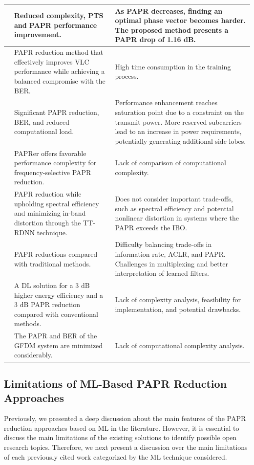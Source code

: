 \documentclass[conference]{IEEEtran}
\begin{document}
\begin{table}[t]
\begin{center}
\begin{tabular}{|c|p{6cm}|p{8cm}|}
\hline
\cite{b155} & Reduced complexity, PTS and PAPR performance improvement. & As PAPR decreases, finding an optimal phase vector becomes harder. The proposed method presents a PAPR drop of 1.16 dB. \\
\hline
\cite{b146} & PAPR reduction method that effectively improves VLC performance while achieving a balanced compromise with the BER. & High time consumption in the training process. \\
\hline
\cite{b152} & Significant PAPR reduction, BER, and reduced computational load. & Performance enhancement reaches saturation point due to a constraint on the transmit power. More reserved subcarriers lead to an increase in power requirements, potentially generating additional side lobes. \\
\hline
\cite{b135} & PAPRer offers favorable performance complexity for frequency-selective PAPR reduction. & Lack of comparison of computational complexity. \\
\hline
\cite{b153} & PAPR reduction while upholding spectral efficiency and minimizing in-band distortion through the TT-RDNN technique. & Does not consider important trade-offs, such as spectral efficiency and potential nonlinear distortion in systems where the PAPR exceeds the IBO. \\
\hline
\cite{b154} & PAPR reductions compared with traditional methods. & Difficulty balancing trade-offs in information rate, ACLR, and PAPR. Challenges in multiplexing and better interpretation of learned filters. \\
\hline
\cite{b150} & A DL solution for a 3 dB higher energy efficiency and a 3 dB PAPR reduction compared with conventional methods. & Lack of complexity analysis, feasibility for implementation, and potential drawbacks. \\
\hline
\cite{b144} & The PAPR and BER of the GFDM system are minimized considerably. & Lack of computational complexity analysis. \\
\hline
\end{tabular}
\label{tab4}
\end{center}
\end{table}

\subsection{Limitations of ML-Based PAPR Reduction Approaches}
Previously, we presented a deep discussion about the main features of the PAPR reduction approaches based on ML in the literature. However, it is essential to discuss the main limitations of the existing solutions to identify possible open research topics. Therefore, we next present a discussion over the main limitations of each previously cited work categorized by the ML technique considered.
\end{document}
